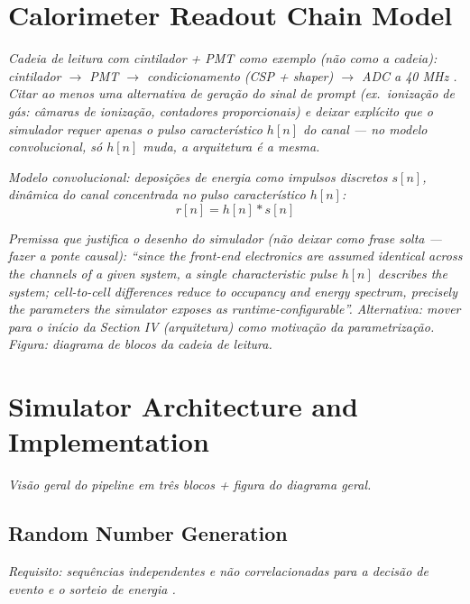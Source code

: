 \documentclass[journal]{IEEEtran}
\newcommand{\todo}[1]{\textcolor{red!70!black}{\textit{#1}}}
\begin{document}
\section{Calorimeter Readout Chain Model}

\todo{Cadeia de leitura com cintilador + PMT como \emph{exemplo} (não como \emph{a} cadeia): cintilador $\rightarrow$ PMT $\rightarrow$ condicionamento (CSP + shaper) $\rightarrow$ ADC a 40 MHz \cite{quirino2025}. Citar ao menos uma alternativa de geração do sinal de prompt (ex.\ ionização de gás: câmaras de ionização, contadores proporcionais) e deixar explícito que o simulador requer apenas o pulso característico $h[n]$ do canal — no modelo convolucional, só $h[n]$ muda, a arquitetura é a mesma.}

\todo{Modelo convolucional: deposições de energia como impulsos discretos $s[n]$, dinâmica do canal concentrada no pulso característico $h[n]$:}
\begin{equation}
  r[n] = h[n] \ast s[n]
\end{equation}

\todo{Premissa que justifica o desenho do simulador (não deixar como frase solta — fazer a ponte causal): ``since the front-end electronics are assumed identical across the channels of a given system, a single characteristic pulse $h[n]$ describes the system; cell-to-cell differences reduce to occupancy and energy spectrum, precisely the parameters the simulator exposes as runtime-configurable''. Alternativa: mover para o início da Section IV (arquitetura) como motivação da parametrização. Figura: diagrama de blocos da cadeia de leitura.}

\section{Simulator Architecture and Implementation}

\todo{Visão geral do pipeline em três blocos + figura do diagrama geral.}

\subsection{Random Number Generation}

\todo{Requisito: sequências independentes e não correlacionadas para a decisão de evento e o sorteio de energia \cite{coates1988}.}
\end{document}
